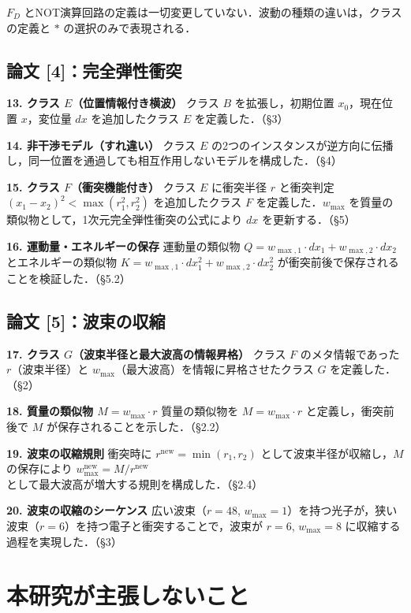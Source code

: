 \documentclass[12pt,a4paper]{ltjsarticle}
\begin{document}
$F_D$ とNOT演算回路の定義は一切変更していない．波動の種類の違いは，クラスの定義と $*$ の選択のみで表現される．

\subsection*{論文 [4]：完全弾性衝突}

\textbf{13. クラス $E$（位置情報付き横波）}\quad
クラス $B$ を拡張し，初期位置 $x_0$，現在位置 $x$，変位量 $dx$ を追加したクラス $E$ を定義した．（\S 3）

\textbf{14. 非干渉モデル（すれ違い）}\quad
クラス $E$ の2つのインスタンスが逆方向に伝播し，同一位置を通過しても相互作用しないモデルを構成した．（\S 4）

\textbf{15. クラス $F$（衝突機能付き）}\quad
クラス $E$ に衝突半径 $r$ と衝突判定 $(x_1 - x_2)^2 < \max(r_1^2, r_2^2)$ を追加したクラス $F$ を定義した．$w_{\max}$ を質量の類似物として，1次元完全弾性衝突の公式により $dx$ を更新する．（\S 5）

\textbf{16. 運動量・エネルギーの保存}\quad
運動量の類似物 $Q = w_{\max,1} \cdot dx_1 + w_{\max,2} \cdot dx_2$ とエネルギーの類似物 $K = w_{\max,1} \cdot dx_1^2 + w_{\max,2} \cdot dx_2^2$ が衝突前後で保存されることを検証した．（\S 5.2）

\subsection*{論文 [5]：波束の収縮}

\textbf{17. クラス $G$（波束半径と最大波高の情報昇格）}\quad
クラス $F$ のメタ情報であった $r$（波束半径）と $w_{\max}$（最大波高）を情報に昇格させたクラス $G$ を定義した．（\S 2）

\textbf{18. 質量の類似物 $M = w_{\max} \cdot r$}\quad
質量の類似物を $M = w_{\max} \cdot r$ と定義し，衝突前後で $M$ が保存されることを示した．（\S 2.2）

\textbf{19. 波束の収縮規則}\quad
衝突時に $r^{\text{new}} = \min(r_1, r_2)$ として波束半径が収縮し，$M$ の保存により $w_{\max}^{\text{new}} = M / r^{\text{new}}$ として最大波高が増大する規則を構成した．（\S 2.4）

\textbf{20. 波束の収縮のシーケンス}\quad
広い波束（$r = 48$, $w_{\max} = 1$）を持つ光子が，狭い波束（$r = 6$）を持つ電子と衝突することで，波束が $r = 6$, $w_{\max} = 8$ に収縮する過程を実現した．（\S 3）

\section*{本研究が主張しないこと}
\end{document}
